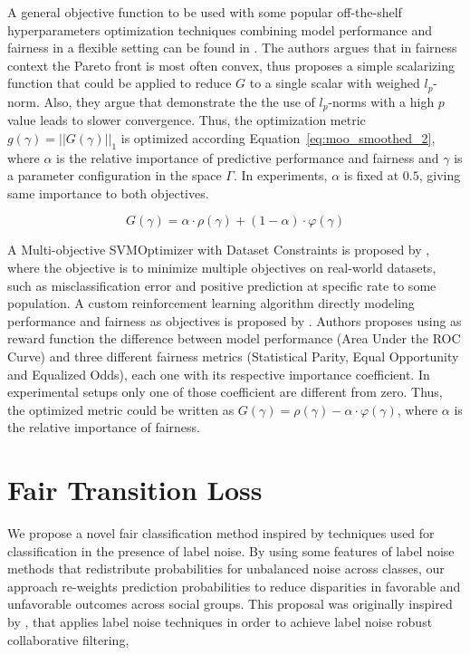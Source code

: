 A general objective function to be used with some popular off-the-shelf hyperparameters optimization techniques combining model performance and fairness in a flexible setting can be found in \cite{Cruz2021}. The authors argues that in fairness context the Pareto front is most often convex, thus proposes a simple scalarizing function that could be applied to reduce $G$ to a single scalar with weighed $l_p$-norm. Also, they argue that \cite{GIAGKIOZIS2015338} demonstrate the the  use  of $l_p$-norms with a high $p$ value leads to slower convergence. Thus, the optimization metric $g(\gamma) = ||G(\gamma)||_1$ is optimized according Equation~\ref{eq:moo_smoothed_2}, where $\alpha$ is the relative importance of predictive performance and fairness and $\gamma$ is a parameter configuration in the space $\Gamma$. In experiments, $\alpha$ is fixed at $0.5$, giving same importance to both objectives.

\begin{equation} \label{eq:moo_smoothed_2}
    G(\gamma) = \alpha \cdot \rho(\gamma) + (1-\alpha) \cdot \varphi(\gamma)
\end{equation}

A Multi-objective SVMOptimizer with Dataset Constraints is proposed by \cite{Goh2016}, where the objective is to minimize multiple objectives on real-world datasets, such as misclassification error and positive prediction at specific rate to some population. A custom reinforcement learning algorithm directly modeling performance and fairness as objectives is proposed by \cite{Petrovic2021}. Authors proposes using as reward function the difference between model performance (Area Under the ROC Curve) and three different fairness metrics (Statistical Parity, Equal Opportunity and Equalized Odds), each one with its respective importance coefficient. In experimental setups only one of those coefficient are different from zero. Thus, the optimized metric could be written as $G(\gamma) = \rho(\gamma) - \alpha \cdot \varphi(\gamma)$, where $\alpha$ is the relative importance of fairness.

\section{Fair Transition Loss} \label{sec:ftl_proposal}

We propose a novel fair classification method inspired by techniques used for classification in the presence of label noise. By using some features of label noise methods that redistribute probabilities for unbalanced noise across classes, our approach re-weights prediction probabilities to reduce disparities in favorable and unfavorable outcomes across social groups. This proposal was originally inspired by \cite{Braida2018}, that applies label noise techniques in order to achieve label noise robust collaborative filtering,

